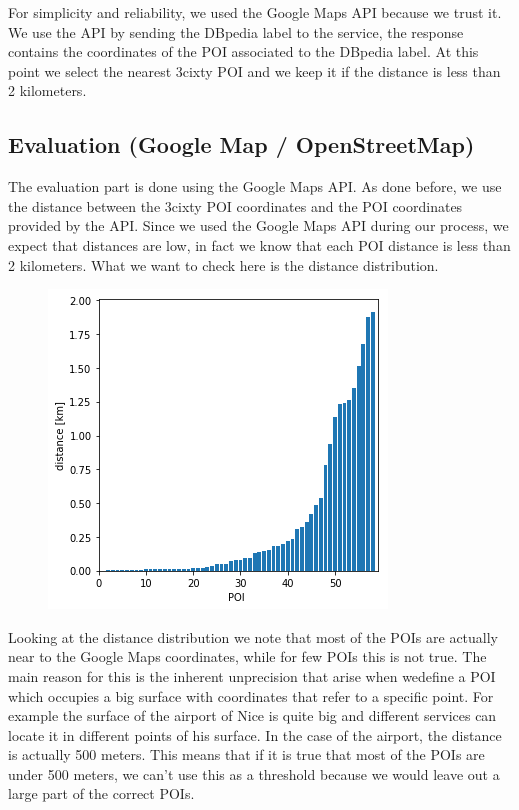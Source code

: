 \documentclass[paper=a4, fontsize=11pt]{scrartcl}
\begin{document}
For simplicity and reliability, we used the Google Maps API because we trust it.
We use the API by sending the DBpedia label to the service, the response contains the coordinates of the POI associated to the DBpedia label. At this point we select the nearest 3cixty POI and we keep it if the distance is less than 2 kilometers.
\subsection{Evaluation (Google Map / OpenStreetMap)}
The evaluation part is done using the Google Maps API. As done before, we use the distance between the 3cixty POI coordinates and the POI coordinates provided by the API. Since we used the Google Maps API during our process, we expect that distances are low, in fact we know that each POI distance is less than 2 kilometers. What we want to check here is the distance distribution.
\begin{figure}
\centering
\includegraphics[]{images/distance.png}\\
\end{figure}
Looking at the distance distribution we note that most of the POIs are actually near to the Google Maps coordinates, while for few POIs this is not true. The main reason for this is the inherent unprecision that arise when wedefine a POI which occupies a big surface with coordinates that refer to a specific point. For example the surface of the airport of Nice is quite big and different services can locate it in different points of his surface. In the case of the airport, the distance is actually 500 meters. This means that if it is true that most of the POIs are under 500 meters, we can't use this as a threshold because we would leave out a large part of the correct POIs.
\end{document}
